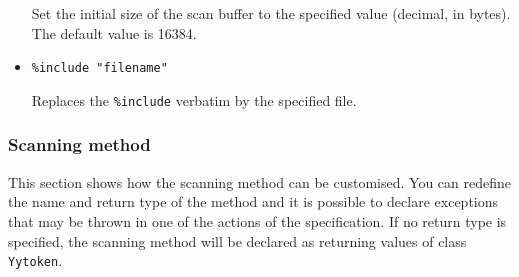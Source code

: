 \begin{itemize}
  Set the initial size of the scan buffer to the specified value
  (decimal, in bytes). The default value is 16384.
\item
  \texttt{\%include\ "filename"}

  Replaces the \texttt{\%include} verbatim by the specified file.
\end{itemize}

\subsubsection{Scanning method}\label{scanning-method}

This section shows how the scanning method can be customised. You can
redefine the name and return type of the method and it is possible to
declare exceptions that may be thrown in one of the actions of the
specification. If no return type is specified, the scanning method will
be declared as returning values of class \texttt{Yytoken}.

